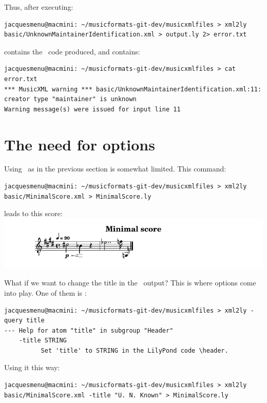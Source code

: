 Thus, after executing:
\begin{lstlisting}[language=Terminal]
jacquesmenu@macmini: ~/musicformats-git-dev/musicxmlfiles > xml2ly basic/UnknownMaintainerIdentification.xml > output.ly 2> error.txt
\end{lstlisting}

 contains the \lily\ code produced, and  contains:
\begin{lstlisting}[language=Terminal]
jacquesmenu@macmini: ~/musicformats-git-dev/musicxmlfiles > cat error.txt
*** MusicXML warning *** basic/UnknownMaintainerIdentification.xml:11: creator type "maintainer" is unknown
Warning message(s) were issued for input line 11
\end{lstlisting}


\section{The need for options}

Using \xmlToLy\ as in the previous section is somewhat limited. This command:
\begin{lstlisting}[language=Terminal]
jacquesmenu@macmini: ~/musicformats-git-dev/musicxmlfiles > xml2ly basic/MinimalScore.xml > MinimalScore.ly
\end{lstlisting}

leads to this score:\\
\includegraphics[scale=0.7]{../mfgraphics/mfgraphicsMinimalScore.png}

What if we want to change the title in the \lily\ output? This is where options come into play. One of them is :
\begin{lstlisting}[language=Terminal]
jacquesmenu@macmini: ~/musicformats-git-dev/musicxmlfiles > xml2ly -query title
--- Help for atom "title" in subgroup "Header"
    -title STRING
          Set 'title' to STRING in the LilyPond code \header.
\end{lstlisting}

Using it this way:
\begin{lstlisting}[language=Terminal]
jacquesmenu@macmini: ~/musicformats-git-dev/musicxmlfiles > xml2ly basic/MinimalScore.xml -title "U. N. Known" > MinimalScore.ly
\end{lstlisting}

